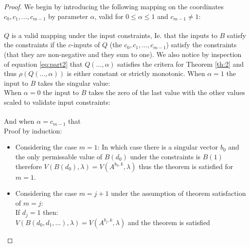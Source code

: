 \begin{proof}
We begin by introducing the following mapping on the coordinates $c_0,c_1,\dots,c_{m-1}$ by parameter $\alpha$, valid for $0\le\alpha\le 1$ and $c_{m-1}\ne 1$:\\
\\
$Q$ is a valid mapping under the input constraints, Ie. that the inputs to $B$ satisfy the constraints if the $c$-inputs of $Q$ (the $c_0,c_1,\dots,c_{m-1}$) satisfy the constraints (that they are non-negative and they sum to one).
We also notice by inspection of equation \ref{eq:part2} that $Q(\dots,\alpha)$ satisfies the critera for Theorem \ref{th:2} and thus $\rho(Q(\dots,\alpha))$ is either constant or strictly monotonic.
When $\alpha=1$ the input to $B$ takes the singular value: \\
When $\alpha=0$ the input to $B$ takes the zero of the last value with the other values scaled to validate input constraints: \\\\
And when $\alpha=c_{m-1}$ that \\
Proof by induction:
\begin{itemize}[leftmargin=*,labelsep=4mm]
\item	Considering the case $m=1$: In which case there is a singular vector $b_0$ and the only permissable value of $B(d_0)$ under the constraints is $B(1)$ therefore $V(B(d_0),\lambda) = V(A^{b_0,k},\lambda)$ thus the theorem is satisfied for $m=1$.
\item   Considering the case $m=j+1$ under the assumption of theorem satisfaction of $m=j$:\\
\-\hspace{4mm}If $d_j=1$ then:\\
\-\hspace{8mm}$V(B(d_0,d_1,\dots),\lambda) = V(A^{b_j,k},\lambda)$ and the theorem is satisfied\\

\end{itemize}
\end{proof}
